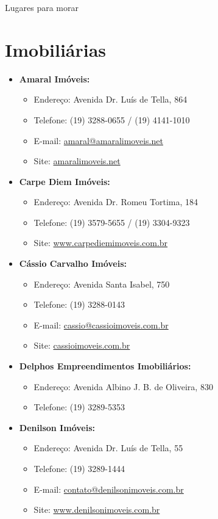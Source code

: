\begin{story}{Lugares para morar}
\section*{Imobiliárias}

\begin{itemize}

\item \textbf{Amaral Imóveis:}
\begin{itemize}
\item Endereço: Avenida Dr. Luís de Tella, 864
\item Telefone: (19) 3288-0655 / (19) 4141-1010
\item E-mail: \url{amaral@amaralimoveis.net}
\item Site: \url{amaralimoveis.net}
\end{itemize}

\item \textbf{Carpe Diem Imóveis:}
\begin{itemize}
\item Endereço: Avenida Dr. Romeu Tortima, 184
\item Telefone: (19) 3579-5655 / (19) 3304-9323
\item Site: \url{www.carpediemimoveis.com.br}
\end{itemize}

\item \textbf{Cássio Carvalho Imóveis:}
\begin{itemize}
\item Endereço: Avenida Santa Isabel, 750
\item Telefone: (19) 3288-0143
\item E-mail: \url{cassio@cassioimoveis.com.br}
\item Site: \url{cassioimoveis.com.br}
\end{itemize}

\item \textbf{Delphos Empreendimentos Imobiliários:}
\begin{itemize}
\item Endereço: Avenida Albino J. B. de Oliveira, 830
\item Telefone: (19) 3289-5353
\end{itemize}

\item \textbf{Denilson Imóveis:}
\begin{itemize}
\item Endereço: Avenida Dr. Luís de Tella, 55
\item Telefone: (19) 3289-1444
\item E-mail: \url{contato@denilsonimoveis.com.br}
\item Site: \url{www.denilsonimoveis.com.br}
\end{itemize}


\end{itemize}
\end{story}
